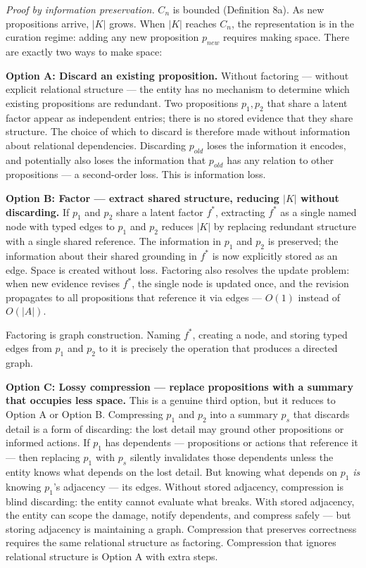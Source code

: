 \documentclass[
]{article}
\begin{document}
\emph{Proof by information preservation.} \(C_n\) is bounded (Definition
8a). As new propositions arrive, \(|K|\) grows. When \(|K|\) reaches
\(C_n\), the representation is in the curation regime: adding any new
proposition \(p_{new}\) requires making space. There are exactly two
ways to make space:

\textbf{Option A: Discard an existing proposition.} Without factoring
--- without explicit relational structure --- the entity has no
mechanism to determine which existing propositions are redundant. Two
propositions \(p_1, p_2\) that share a latent factor appear as
independent entries; there is no stored evidence that they share
structure. The choice of which to discard is therefore made without
information about relational dependencies. Discarding \(p_{old}\) loses
the information it encodes, and potentially also loses the information
that \(p_{old}\) has any relation to other propositions --- a
second-order loss. This is information loss.

\textbf{Option B: Factor --- extract shared structure, reducing \(|K|\)
without discarding.} If \(p_1\) and \(p_2\) share a latent factor
\(f^*\), extracting \(f^*\) as a single named node with typed edges to
\(p_1\) and \(p_2\) reduces \(|K|\) by replacing redundant structure
with a single shared reference. The information in \(p_1\) and \(p_2\)
is preserved; the information about their shared grounding in \(f^*\) is
now explicitly stored as an edge. Space is created without loss.
Factoring also resolves the update problem: when new evidence revises
\(f^*\), the single node is updated once, and the revision propagates to
all propositions that reference it via edges --- \(O(1)\) instead of
\(O(|A|)\).

Factoring is graph construction. Naming \(f^*\), creating a node, and
storing typed edges from \(p_1\) and \(p_2\) to it is precisely the
operation that produces a directed graph.

\textbf{Option C: Lossy compression --- replace propositions with a
summary that occupies less space.} This is a genuine third option, but
it reduces to Option A or Option B. Compressing \(p_1\) and \(p_2\)
into a summary \(p_s\) that discards detail is a form of discarding:
the lost detail may ground other propositions or informed actions. If
\(p_1\) has dependents --- propositions or actions that reference it ---
then replacing \(p_1\) with \(p_s\) silently invalidates those
dependents unless the entity knows what depends on the lost detail. But
knowing what depends on \(p_1\) \emph{is} knowing \(p_1\)'s adjacency
--- its edges. Without stored adjacency, compression is blind
discarding: the entity cannot evaluate what breaks. With stored
adjacency, the entity can scope the damage, notify dependents, and
compress safely --- but storing adjacency is maintaining a graph.
Compression that preserves correctness requires the same relational
structure as factoring. Compression that ignores relational structure is
Option A with extra steps.
\end{document}

